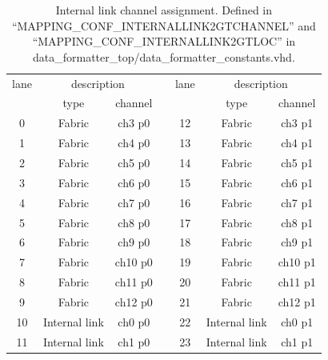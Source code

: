 \documentclass[11pt,letterpaper]{article}
\begin{document}
\begin{table}[h]
\centering
\begin{tabular}{|c|c|c|c|c|c|c|}
\cline{1-3} \cline{5-7}
lane & \multicolumn{2}{c|}{description} &  & lane & \multicolumn{2}{c|}{description} \\ \cline{1-3} \cline{5-7} 
     & type               & channel     &  &      & type               & channel     \\ \cline{1-3} \cline{5-7} 
0    & Fabric             & ch3 p0      &  & 12   & Fabric             & ch3 p1      \\ \cline{1-3} \cline{5-7} 
1    & Fabric             & ch4 p0      &  & 13   & Fabric             & ch4 p1      \\ \cline{1-3} \cline{5-7} 
2    & Fabric             & ch5 p0      &  & 14   & Fabric             & ch5 p1      \\ \cline{1-3} \cline{5-7} 
3    & Fabric             & ch6 p0      &  & 15   & Fabric             & ch6 p1      \\ \cline{1-3} \cline{5-7} 
4    & Fabric             & ch7 p0      &  & 16   & Fabric             & ch7 p1      \\ \cline{1-3} \cline{5-7} 
5    & Fabric             & ch8 p0      &  & 17   & Fabric             & ch8 p1      \\ \cline{1-3} \cline{5-7} 
6    & Fabric             & ch9 p0      &  & 18   & Fabric             & ch9 p1      \\ \cline{1-3} \cline{5-7} 
7    & Fabric             & ch10 p0     &  & 19   & Fabric             & ch10 p1     \\ \cline{1-3} \cline{5-7} 
8    & Fabric             & ch11 p0     &  & 20   & Fabric             & ch11 p1     \\ \cline{1-3} \cline{5-7} 
9    & Fabric             & ch12 p0     &  & 21   & Fabric             & ch12 p1     \\ \cline{1-3} \cline{5-7} 
10   & Internal link      & ch0 p0      &  & 22   & Internal link      & ch0 p1      \\ \cline{1-3} \cline{5-7} 
11   & Internal link      & ch1 p0      &  & 23   & Internal link      & ch1 p1      \\ \cline{1-3} \cline{5-7} 
\end{tabular}
\caption{Internal link channel assignment. Defined in 
``MAPPING\_CONF\_INTERNALLINK2GTCHANNEL'' and ``MAPPING\_CONF\_INTERNALLINK2GTLOC'' in data\_formatter\_top/data\_formatter\_constants.vhd.}
\end{table}
\end{document}
